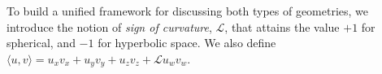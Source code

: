 To build a unified framework for discussing both types of geometries, we introduce the notion of \textit{sign of curvature}, $\mathcal{L}$, that attains the value $+1$ for spherical, and $-1$ for hyperbolic space.
We also define $\langle u, v \rangle = u_xv_x + u_yv_y + u_zv_z + \mathcal{L}u_wv_w$.
